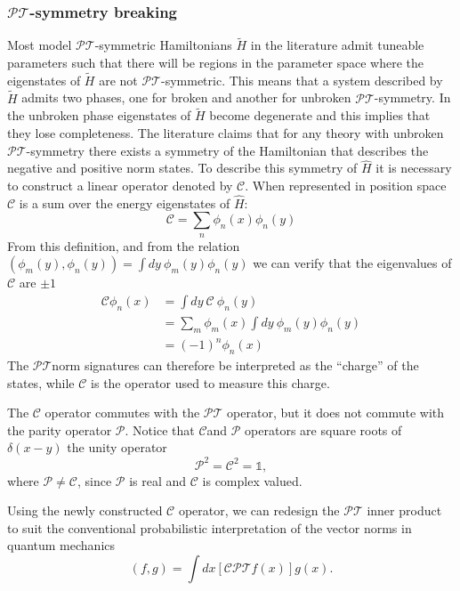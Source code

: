 \documentclass[12pt, a4paper]{report}
\newcommand\PT{\(\mathcal{PT}\)}
\newcommand\PP{\(\mathcal{P}\)}
\newcommand\CC{\(\mathcal{C}\)}
\begin{document}
\subsubsection{\PT-symmetry breaking}\label{breaking}
Most model \PT-symmetric Hamiltonians $\tilde{H}$ in the literature admit tuneable parameters such that there will be regions in the parameter space where the eigenstates of $\tilde{H}$ are not \PT-symmetric\cite{Brody_2013}. This means that a system described by $\tilde{H}$ admits two phases, one for broken and another for unbroken \PT-symmetry. In the unbroken phase eigenstates of $\tilde{H}$ become degenerate and this implies that they lose completeness\cite{Brody_2013}. The literature claims that for any theory with unbroken \PT-symmetry there exists a symmetry of the Hamiltonian that describes the negative and positive norm states. To describe this symmetry of $\hat{H}$ it is necessary to construct a linear operator denoted by \CC\cite{MustaHbeHermitian}\cite{ComplexExtension}\cite{Bender_2004}. When represented in position space \CC\: is a sum over the energy eigenstates of $\hat{H}$:
\begin{equation}\label{eq:1.8}
\mathcal{C} = \sum_n \phi_n(x)\phi_n(y)
\end{equation}
From this definition, and from the relation $(\phi_m(y), \phi_n(y)) = \int dy\:\phi_m(y)\phi_n(y)$ we can verify that the eigenvalues of \CC\: are $\pm 1$
\begin{align}\label{eq:1.9}
\mathcal{C} \phi_n(x) & = \int dy\:\mathcal{C}\:\phi_n(y)\nonumber \\
& = \sum_{m}\phi_m(x)\int dy\:\phi_m(y) \phi_n(y)\nonumber \\
& = (-1)^n \phi_n(x)
\end{align}
The \PT\:norm signatures can therefore be interpreted as the ``charge'' of the states, while \CC\: is the operator used to measure this charge\cite{Bender_2004}.

The \CC\: operator commutes with the \PT\: operator, but it does not commute with the parity operator \PP. Notice that \CC\:and \PP\: operators are square roots of $\delta(x-y)$ the unity operator\cite{ComplexExtension}
\begin{equation}\label{eq:1.10}
\mathcal{P}^2 = \mathcal{C}^2 = \mathds{1}, 
\end{equation}
where $\mathcal{P} \neq \mathcal{C}$, since \PP\: is real and \CC\: is complex valued\cite{MustaHbeHermitian}\cite{Bender_2004}.

Using the newly constructed \CC\: operator, we can redesign the \PT\: inner product to suit the conventional probabilistic interpretation of the vector norms in quantum mechanics
\begin{equation}\label{eq:1.11}
\left( f, g \right ) = \int dx \left [ \mathcal{CPT} f(x) \right ] g(x).
\end{equation}
\end{document}
